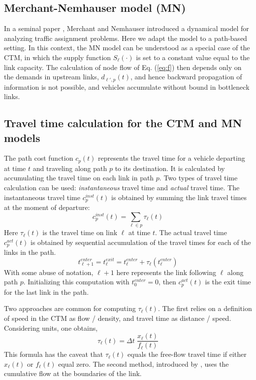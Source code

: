 \subsection{Merchant-Nemhauser model (MN)}
In a seminal paper \cite{merchant1978model, merchant1978optimality}, Merchant and Nemhauser introduced a dynamical model for analyzing traffic assignment problems. Here we adapt the model to a path-based setting. In this context, the MN model can be understood as a special case of the CTM, in which the supply function $S_\ell(\cdot)$ is set to a constant value equal to the link capacity. The calculation of node flow of Eq. (\ref{eq:f}) then depends only on the demands in upstream links, $d_{\ell',p}(t)$, and hence backward propagation of information is not possible, and vehicles accumulate without bound in bottleneck links.

\subsection{Travel time calculation for the CTM and MN models}
The path cost function $c_p(t)$ represents the travel time for a vehicle departing at time $t$ and traveling along path $p$ to its destination. It is calculated by accumulating the travel time on each link in path $p$. Two types of travel time calculation can be used: \textit{instantaneous} travel time and \textit{actual} travel time. The instantaneous travel time $c_p^{inst}(t)$ is obtained by summing the link travel times at the moment of departure:
\begin{equation}
c_p^{inst}(t) = \sum_{\ell\in p} \tau_\ell(t)
\end{equation}
Here $\tau_\ell(t)$ is the travel time on link $\ell$ at time $t$. The actual travel time $c_p^{act}(t)$ is obtained by sequential accumulation of the travel times for each of the links in the path.
\begin{equation}
t^{enter}_{\ell+1} = t^{exit}_{\ell} = t^{enter}_{\ell} + \tau_{\ell}(t^{enter}_{\ell})
\end{equation}
With some abuse of notation, $\ell+1$ here represents the link following $\ell$ along path $p$.
Initializing this computation with $t^{enter}_{0}=0$, then $c_p^{act}(t)$ is the exit time for the last link in the path.

Two approaches are common for computing $\tau_\ell(t)$. The first relies on a definition of speed in the CTM as flow / density, and travel time as distance / speed. Considering units, one obtains,
\begin{equation}
\tau_\ell(t) = \Delta t \; \frac{x_\ell(t)}{f_\ell(t)}
\end{equation}
This formula has the caveat that $\tau_\ell(t)$ equals the free-flow travel time if either $x_\ell(t)$ or $f_\ell(t)$ equal zero. The second method, introduced by \cite{newell1993simplified}, uses the cumulative flow at the boundaries of the link. 

